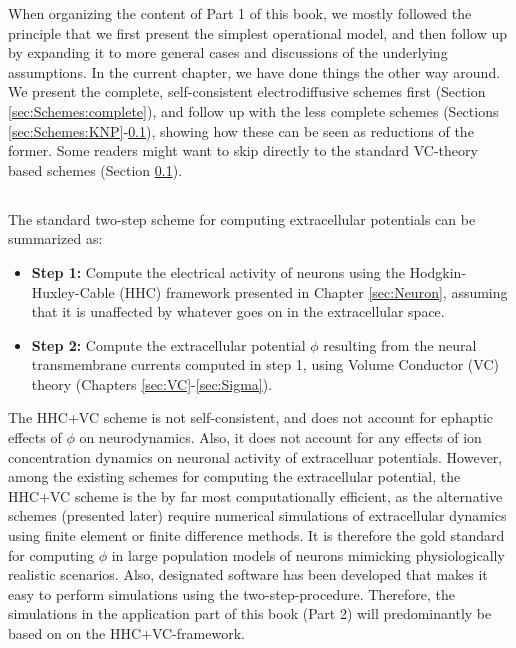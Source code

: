 When organizing the content of Part 1 of this book, we mostly followed the principle that we first present the simplest operational model, and then follow up by expanding it to more general cases and discussions of the underlying assumptions. In the current chapter, we have done things the other way around. We present the complete, self-consistent electrodiffusive schemes first (Section \ref{sec:Schemes:complete}), and follow up with the less complete schemes (Sections \ref{sec:Schemes:KNP}-\ref{sec:Schemes:VC}), showing how these can be seen as reductions of the former. 
Some readers might want to skip directly to the standard VC-theory based schemes (Section \ref{sec:Schemes:VC}).





\subsection{}
\label{sec:Schemes:VC}
The standard two-step scheme for computing extracellular potentials can be summarized as: 

\begin{itemize}
\item {\bf Step 1:} Compute the electrical activity of neurons using the Hodgkin-Huxley-Cable (HHC) framework presented in Chapter \ref{sec:Neuron}, assuming that it is unaffected by whatever goes on in the extracellular space. 
\item {\bf Step 2:} Compute the extracellular potential $\phi$ resulting from the neural transmembrane currents computed in step 1, using Volume Conductor (VC) theory (Chapters \ref{sec:VC}-\ref{sec:Sigma}). 
\end{itemize}

The HHC+VC scheme is not self-consistent, and does not account for ephaptic effects of $\phi$ on neurodynamics. Also, it does not account for any effects of ion concentration dynamics on neuronal activity of extracelluar potentials. However, among the existing schemes for computing the extracellular potential, the HHC+VC scheme is the by far most computationally efficient, as the alternative schemes (presented later) require numerical simulations of extracellular dynamics using finite element or finite difference methods. It is therefore the gold standard for computing $\phi$ in large population models of neurons mimicking physiologically realistic scenarios. Also, designated software has been developed that makes it easy to perform simulations using the two-step-procedure. Therefore, the simulations in the application part of this book (Part 2) will predominantly be based on on the HHC+VC-framework.

